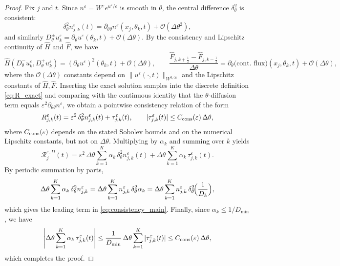 \documentclass[11pt, dina4, amsfont12]{article}
\begin{document}
\begin{proof}
Fix $j$ and $t$. Since $n^\varepsilon=W^\varepsilon e^{u^\varepsilon/\varepsilon}$ is smooth in $\theta$,
the central difference $\delta_\theta^2$ is consistent:
\[
\delta_\theta^2 n_{j,k}^\varepsilon(t)
=
\partial_{\theta\theta}n^\varepsilon(x_j,\theta_k,t)
+\mathcal O(\Delta\theta^2),
\]
and similarly $D_\theta^\pm u_k^\varepsilon=\partial_\theta u^\varepsilon(\theta_k,t)+\mathcal O(\Delta\theta)$.
By the consistency and Lipschitz continuity of $\widehat H$ and $\widehat F$, we have
\[
\widehat H(D_\theta^-u_k^\varepsilon,D_\theta^+u_k^\varepsilon)
=
(\partial_\theta u^\varepsilon)^2(\theta_k,t)+\mathcal O(\Delta\theta),
\qquad
\frac{\widehat F_{j,k+\frac12}-\widehat F_{j,k-\frac12}}{\Delta\theta}
=
\partial_\theta\bigl(\text{cont.\ flux}\bigr)(x_j,\theta_k,t)+\mathcal O(\Delta\theta),
\]
where the $\mathcal O(\Delta\theta)$ constants depend on
$\|u^\varepsilon(\cdot,t)\|_{W^{3,\infty}}$ and the Lipschitz constants of $\widehat H,\widehat F$.
Inserting the exact solution samples into the discrete definition \eqref{eq:R_exact} and comparing
with the continuous identity that the $\theta$-diffusion term equals $\varepsilon^2\partial_{\theta\theta}n^\varepsilon$,
we obtain a pointwise consistency relation of the form
\[
R_{j,k}^\varepsilon(t)
=
\varepsilon^2\,\delta_\theta^2 n_{j,k}^\varepsilon(t)
+\tau_{j,k}^\varepsilon(t),
\qquad
|\tau_{j,k}^\varepsilon(t)|\le C_{\rm cons}(\varepsilon)\,\Delta\theta,
\]
where $C_{\rm cons}(\varepsilon)$ depends on the stated Sobolev bounds and on the numerical
Lipschitz constants, but not on $\Delta\theta$.
Multiplying by $\alpha_k$ and summing over $k$ yields
\[
\mathcal R_{j}^{\varepsilon,D}(t)
=
\varepsilon^2\,\Delta\theta\sum_{k=1}^K \alpha_k\,\delta_\theta^2 n_{j,k}^\varepsilon(t)
+
\Delta\theta\sum_{k=1}^K \alpha_k\,\tau_{j,k}^\varepsilon(t).
\]
By periodic summation by parts,
\[
\Delta\theta\sum_{k=1}^K \alpha_k\,\delta_\theta^2 n_{j,k}^\varepsilon
=
\Delta\theta\sum_{k=1}^K n_{j,k}^\varepsilon\,\delta_\theta^2\alpha_k
=
\Delta\theta\sum_{k=1}^K n_{j,k}^\varepsilon\,\delta_\theta^2\!\Bigl(\frac1{D_k}\Bigr),
\]
which gives the leading term in \eqref{eq:consistency_main}. Finally, since
$\alpha_k\le 1/D_{\min}$, we have
\[
\left|\Delta\theta\sum_{k=1}^K \alpha_k\,\tau_{j,k}^\varepsilon(t)\right|
\le
\frac{1}{D_{\min}}\,
\Delta\theta\sum_{k=1}^K |\tau_{j,k}^\varepsilon(t)|
\le
C_{\rm cons}(\varepsilon)\,\Delta\theta,
\]
which completes the proof.
\end{proof}
\end{document}
